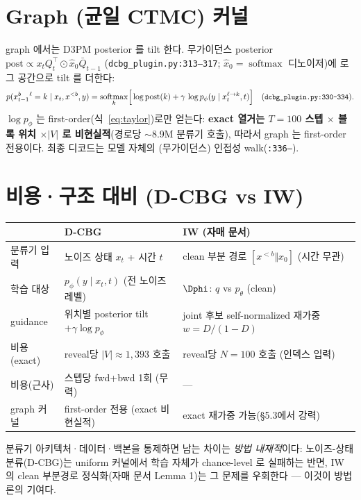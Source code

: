 \documentclass[11pt]{article}
\newcommand{\code}[1]{\texttt{\small #1}}
\newcommand{\xpre}{x^{<b}}
\newcommand{\xblk}{x^{b}}
\newcommand{\pth}{p_\theta}
\newcommand{\pphi}{p_\phi}
\newcommand{\Qb}{\bar{Q}}
\DeclareMathOperator{\softmax}{softmax}
\theoremstyle{plain}
\theoremstyle{definition}
\begin{document}
\section{Graph (균일 CTMC) 커널}
graph 에서는 D3PM posterior 를 tilt 한다. 무가이던스 posterior
$\text{post}\propto x_t Q_t^{\top}\odot \hat{x}_0\Qb_{t-1}$
(\code{dcbg\_plugin.py:313--317}; $\hat x_0=\softmax$ 디노이저)에 로그 공간으로 tilt 를 더한다:
\begin{equation}
p(\xblk_{t-1}{}^{\ell}=k\mid x_t,\xpre,y)
=\softmax_k\!\Big[\log\text{post}(k)+\gamma\,\log\pphi(y\mid x_t^{\ell\to k},t)\Big]
\quad(\code{dcbg\_plugin.py:330--334}).
\end{equation}
$\log\pphi$ 는 first-order(식~\eqref{eq:taylor})로만 얻는다:
\textbf{exact 열거는 $T{=}100$ 스텝 $\times$ 블록 위치 $\times |V|$ 로 비현실적}(경로당 $\sim$8.9M 분류기 호출),
따라서 graph 는 first-order 전용이다. 최종 디코드는 모델 자체의 (무가이던스) 인접성 walk(\code{:336--}).

\section{비용·구조 대비 (D-CBG vs IW)}
\begin{center}
\renewcommand{\arraystretch}{1.25}
\begin{tabular}{@{}l l l@{}}
\toprule
 & \textbf{D-CBG} & \textbf{IW (자매 문서)}\\
\midrule
분류기 입력 & 노이즈 상태 $x_t$ + 시간 $t$ & clean 부분 경로 $[\xpre\Vert x_0]$ (시간 무관)\\
학습 대상 & $\pphi(y\mid x_t,t)$ (전 노이즈레벨) & $\Dphi$: $q$ vs $\pth$ (clean)\\
guidance & 위치별 posterior tilt $+\gamma\log\pphi$ & joint 후보 self-normalized 재가중 $w{=}D/(1{-}D)$\\
비용(exact) & reveal당 $|V|\approx1{,}393$ 호출 & reveal당 $N{=}100$ 호출 (인덱스 입력)\\
비용(근사) & 스텝당 fwd+bwd 1회 (무력) & —\\
graph 커널 & first-order 전용 (exact 비현실적) & exact 재가중 가능(§5.3에서 강력)\\
\bottomrule
\end{tabular}
\end{center}
\noindent 분류기 아키텍처·데이터·백본을 통제하면 남는 차이는 \emph{방법 내재적}이다:
노이즈-상태 분류(D-CBG)는 uniform 커널에서 학습 자체가 chance-level 로 실패하는 반면,
IW 의 clean 부분경로 정식화(자매 문서 Lemma 1)는 그 문제를 우회한다 — 이것이 방법론의 기여다.
\end{document}
